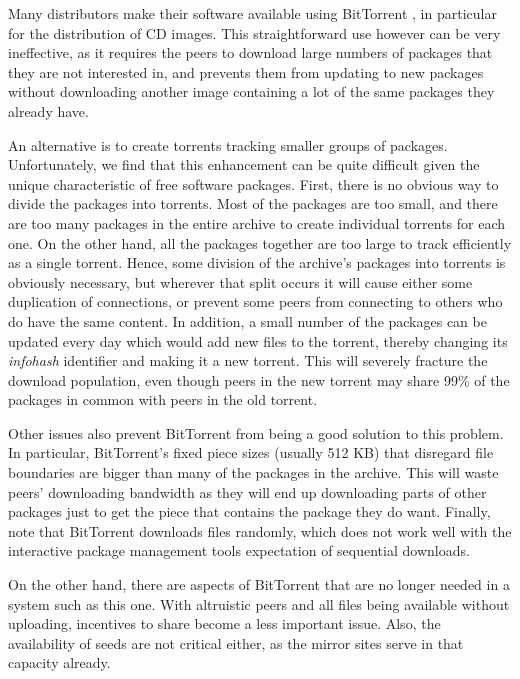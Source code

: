 \documentclass[conference]{IEEEtran}
\begin{document}
Many distributors make their software available using
BitTorrent \cite{COHEN03}, in particular for the distribution of CD
images. This straightforward use however can be very ineffective, as it requires the
peers to download large numbers of packages that they are not
interested in, and prevents them from updating to new packages
without downloading another image containing a lot of the same
packages they already have. 

An alternative is to create torrents tracking smaller groups of packages. Unfortunately, we find that this enhancement can be
quite difficult given the unique characteristic of free software packages. 
First, there is no obvious way to divide the packages into torrents.
Most of the packages are too small, and there are too many packages
in the entire archive to create individual torrents for each one.
On the other hand, all the packages together are too large to track
efficiently as a single torrent. Hence, some division of the archive's
packages into torrents is obviously necessary, but wherever that
split occurs it will cause either some duplication of connections,
or prevent some peers from connecting to others who do have the same
content. In addition, a small number of the packages can be updated every
day which would add new files to the torrent, thereby changing its
\emph{infohash} identifier and making it a new torrent. This will
severely fracture the download population, even though peers in the
new torrent may share 99\% of the packages in common with peers in the
old torrent.

Other issues also prevent BitTorrent from being a good solution to
this problem. In particular, BitTorrent's fixed piece sizes (usually 512 KB) that disregard file
boundaries are bigger than many of the packages in the archive. This
will waste peers' downloading bandwidth as they will end up
downloading parts of other packages just to get the piece that
contains the package they do want. 
Finally, note that BitTorrent downloads files
randomly, which does not work well with the interactive package
management tools expectation of sequential downloads.

On the other hand, there are aspects of BitTorrent that are no
longer needed in a system such as this one. With altruistic peers
and all files being available without uploading, incentives to share
become a less important issue. Also, the availability of seeds are
not critical either, as the mirror sites serve in that capacity
already.

\end{document}
